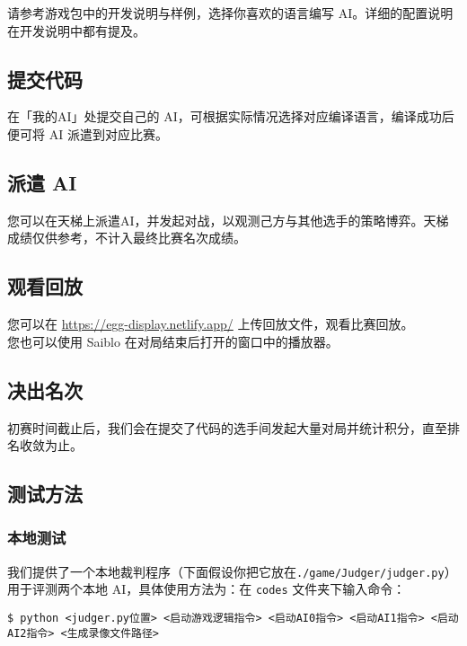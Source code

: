 \documentclass[UTF8]{article}
\begin{document}
请参考游戏包中的开发说明与样例，选择你喜欢的语言编写
AI。详细的配置说明在开发说明中都有提及。

\hypertarget{header-n41}{%
\subsection{提交代码}\label{header-n41}}

在「我的AI」处提交自己的
AI，可根据实际情况选择对应编译语言，编译成功后便可将 AI 派遣到对应比赛。

\hypertarget{header-n43}{%
\subsection{派遣 AI}\label{header-n43}}

您可以在天梯上派遣AI，并发起对战，以观测己方与其他选手的策略博弈。天梯成绩仅供参考，不计入最终比赛名次成绩。

\hypertarget{header-n45}{%
\subsection{观看回放}\label{header-n45}}

您可以在 \url{https://egg-display.netlify.app/} 上传回放文件，观看比赛回放。\\
您也可以使用 Saiblo 在对局结束后打开的窗口中的播放器。

\hypertarget{header-n47}{%
\subsection{决出名次}\label{header-n47}}

初赛时间截止后，我们会在提交了代码的选手间发起大量对局并统计积分，直至排名收敛为止。

\hypertarget{header-n49}{%
\subsection{测试方法}\label{header-n49}}

\hypertarget{header-n50}{%
\subsubsection{本地测试}\label{header-n50}}

我们提供了一个本地裁判程序（下面假设你把它放在\texttt{./game/Judger/judger.py}）
用于评测两个本地 AI，具体使用方法为：在 \texttt{codes} 文件夹下输入命令：

\begin{verbatim}
$ python <judger.py位置> <启动游戏逻辑指令> <启动AI0指令> <启动AI1指令> <启动AI2指令> <生成录像文件路径>
\end{verbatim}
\end{document}

